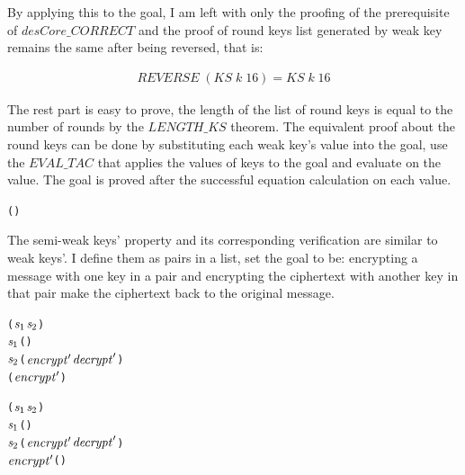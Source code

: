 \documentclass{article}
\begin{document}
By applying this to the goal, I am left with only the proofing of the prerequisite of $desCore\_CORRECT$ and the
proof of round keys list generated by weak key remains the same after being reversed, that is:

\begin{multline}
 REVERSE \; (KS \; k \; 16)= KS \; k \; 16
\end{multline}

The rest part is easy to prove, the length of the list of round keys is equal to the number of rounds by the $LENGTH\_KS$
theorem. The equivalent proof about the round keys can be done by substituting each weak key's value into the goal,
use the $EVAL\_TAC$ that applies the values of keys to the goal and evaluate on the value. The goal is proved after
the successful equation calculation on each value.

\begin{alltt}
   \HOLTokenTurnstile{}  (  ) \HOLSymConst{=} 
\end{alltt}

The semi-weak keys' property and its corresponding verification are similar to weak keys'. I define them as pairs in a list,
set the goal to be: encrypting a message with one key in a pair and encrypting the ciphertext with another key
in that pair make the ciphertext back to the original message.

\begin{alltt}
   \HOLTokenTurnstile{}    \HOLSymConst{\HOLTokenConj{}}  \HOLSymConst{=} (\ensuremath{\HOLFreeVar{s}\sb{\mathrm{1}}}\HOLSymConst{,}\ensuremath{\HOLFreeVar{s}\sb{\mathrm{2}}}) \HOLSymConst{\HOLTokenConj{}}
    \ensuremath{\HOLFreeVar{s}\sb{\mathrm{1}}} \HOLSymConst{=} (\HOLSymConst{,}) \HOLSymConst{\HOLTokenConj{}}
    \ensuremath{\HOLFreeVar{s}\sb{\mathrm{2}}} \HOLSymConst{=} (\ensuremath{\HOLFreeVar{encrypt}\sp{\prime{}}}\HOLSymConst{,}\ensuremath{\HOLFreeVar{decrypt}\sp{\prime{}}}) \HOLSymConst{\HOLTokenImp{}}
    (\ensuremath{\HOLFreeVar{encrypt}\sp{\prime{}}} ) \HOLSymConst{=} 
\end{alltt}

\begin{alltt}
   \HOLTokenTurnstile{}    \HOLSymConst{\HOLTokenConj{}}  \HOLSymConst{=} (\ensuremath{\HOLFreeVar{s}\sb{\mathrm{1}}}\HOLSymConst{,}\ensuremath{\HOLFreeVar{s}\sb{\mathrm{2}}}) \HOLSymConst{\HOLTokenConj{}}
    \ensuremath{\HOLFreeVar{s}\sb{\mathrm{1}}} \HOLSymConst{=} (\HOLSymConst{,}) \HOLSymConst{\HOLTokenConj{}}
    \ensuremath{\HOLFreeVar{s}\sb{\mathrm{2}}} \HOLSymConst{=} (\ensuremath{\HOLFreeVar{encrypt}\sp{\prime{}}}\HOLSymConst{,}\ensuremath{\HOLFreeVar{decrypt}\sp{\prime{}}}) \HOLSymConst{\HOLTokenImp{}}
   \ensuremath{\HOLFreeVar{encrypt}\sp{\prime{}}} ( ) \HOLSymConst{=} 
\end{alltt}
\end{document}
